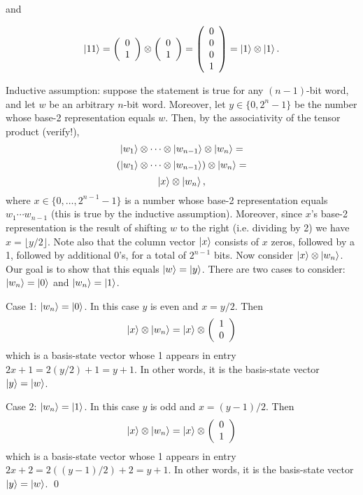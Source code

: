 \documentclass [12pt]{article}
\theoremstyle{definition}
\begin{document}
\begin{enumerate}
and

\[\ket{11} = 
\left(\begin{array}{c}
0 \\
1\\
\end{array}\right)
\otimes
\left(\begin{array}{c}
0 \\
1\\
\end{array}\right)
=
\left(\begin{array}{c}
0\\
0\\
0\\
1\\
\end{array}\right)
=\ket{1}\otimes \ket{1}.
\]

Inductive assumption: suppose the statement is true for any $(n-1)$-bit word, and let $w$ be an arbitrary $n$-bit word. 
Moreover, let $y\in \{0,2^n-1\}$ be the number whose base-2 representation equals $w$.
Then, by the associativity of the tensor product (verify!), 
\[\ket{w_1}\otimes\cdots\otimes\ket{w_{n-1}}\otimes \ket{w_n} =\]
\[(\ket{w_1}\otimes\cdots\otimes\ket{w_{n-1}})\otimes \ket{w_n} =\]
\[\ket{x}\otimes \ket{w_n},\]
where $x\in \{0,\ldots,2^{n-1}-1\}$ is a number whose base-2 representation equals $w_1\cdots w_{n-1}$ (this is true by the inductive assumption).
Moreover, since $x$'s base-2 representation is the result of shifting $w$ to the right (i.e. dividing by 2) we have $x=\lfloor y/2\rfloor$. 
Note also that the column vector $\ket{x}$ consists of $x$ zeros, followed by a 1, followed by additional 0's, for a total of $2^{n-1}$ bits. Now consider $\ket{x}\otimes\ket{w_n}$. Our goal is to show 
that this equals $\ket{w}=\ket{y}$. There are two cases to consider: $\ket{w_n}=\ket{0}$ and $\ket{w_n}=\ket{1}$.

Case 1: $\ket{w_n}=\ket{0}$. In this case $y$ is even and $x = y/2$. Then 
\[\ket{x} \otimes \ket{w_n} = \ket{x} \otimes
\left(\begin{array}{c}
1\\
0\\
\end{array}\right)
\]
which is a basis-state vector whose 1 appears in entry $2x+1 = 2(y/2) + 1 = y+1$. In other words, it is the basis-state vector $\ket{y}=\ket{w}$.

Case 2: $\ket{w_n}=\ket{1}$. In this case $y$ is odd and $x = (y-1)/2$. Then 
\[\ket{x} \otimes \ket{w_n} = \ket{x} \otimes
\left(\begin{array}{c}
0\\
1\\
\end{array}\right)
\]
which is a basis-state vector whose 1 appears in entry $2x+2 = 2((y-1)/2) + 2 = y+1$. In other words, it is the basis-state vector $\ket{y}=\ket{w}$.
\qed


\end{enumerate}
\end{document}
